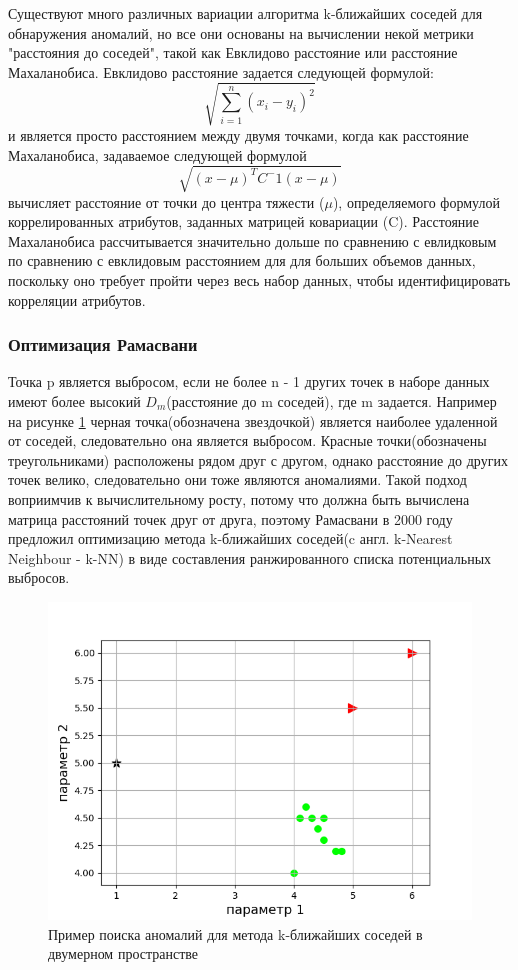 Существуют много  различных вариации алгоритма k-ближайших соседей для обнаружения аномалий, но все они основаны на вычислении некой метрики "расстояния до соседей", такой как Евклидово расстояние или  расстояние Махаланобиса. Евклидово расстояние задается следующей формулой:
 	\begin{equation}
 	\sqrt{\sum_{i=1}^n(x_i-y_i)^2}
 		\end{equation}
 и является просто расстоянием между двумя точками, когда как  расстояние Махаланобиса, задаваемое следующей формулой
 	\begin{equation}
 	\sqrt{(x-\mu)^T C^-1 (x-\mu)}
 	\end{equation}
 	вычисляет расстояние от точки до центра тяжести ($\mu$), определяемого формулой коррелированных атрибутов, заданных матрицей ковариации (C). Расстояние  Махаланобиса
 	рассчитывается значительно дольше по сравнению с евлидковым
 	 по сравнению с евклидовым расстоянием для для больших объемов данных, поскольку оно требует
 	пройти через весь набор данных, чтобы идентифицировать корреляции атрибутов.

 \subsubsection{Оптимизация Рамасвани} 	
 Точка p является выбросом,
если не более n - 1 других точек в наборе данных имеют более высокий $D_m$(расстояние до m соседей), где m задается. Например на рисунке \ref{fig02} черная точка(обозначена звездочкой) является наиболее удаленной от соседей, следовательно она является выбросом. Красные точки(обозначены треугольниками) расположены рядом друг с другом, однако расстояние до других точек велико, следовательно они тоже являются аномалиями. Такой подход воприимчив к вычислительному росту, потому что должна быть вычислена матрица расстояний точек друг от друга, поэтому Рамасвани в 2000 году предложил оптимизацию метода k-ближайших соседей(c англ. k-Nearest Neighbour - k-NN)  в виде составления ранжированного списка потенциальных выбросов.
\begin{figure}
	\centering
	\includegraphics[width=.5\textwidth]{img/2_1.png}
	\caption{Пример поиска аномалий для метода k-ближайших соседей в двумерном пространстве}
	\label{fig02}
\end{figure}

